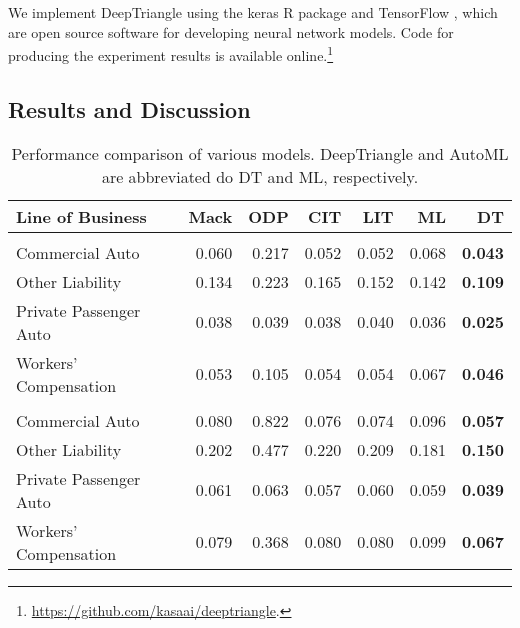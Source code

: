 \documentclass[risks,article,submit,moreauthors,pdftex]{mdpi}
\begin{document}
We implement DeepTriangle using the keras R package \citep{chollet2017kerasR} and TensorFlow \citep{tensorflow2015-whitepaper}, which are open source software for developing neural network models. Code for producing the experiment results is available online.\footnote{\url{https://github.com/kasaai/deeptriangle}.}

\hypertarget{results-and-discussion}{%
\subsection{Results and Discussion}\label{results-and-discussion}}

\begin{table}[t]

\caption{\label{tab:unnamed-chunk-1}\label{tab:table1}Performance comparison of various models. DeepTriangle and AutoML are abbreviated do DT and ML, respectively.}
\centering
\begin{tabular}{lrrrrr>{\bfseries}r}
\toprule
Line of Business & Mack & ODP & CIT & LIT & ML & DT\\
\midrule
\addlinespace[0.3em]
\multicolumn{7}{l}{\textbf{MAPE}}\\
\hspace{1em}Commercial Auto & 0.060 & 0.217 & 0.052 & 0.052 & 0.068 & 0.043\\
\hspace{1em}Other Liability & 0.134 & 0.223 & 0.165 & 0.152 & 0.142 & 0.109\\
\hspace{1em}Private Passenger Auto & 0.038 & 0.039 & 0.038 & 0.040 & 0.036 & 0.025\\
\hspace{1em}Workers' Compensation & 0.053 & 0.105 & 0.054 & 0.054 & 0.067 & 0.046\\
\addlinespace[0.3em]
\multicolumn{7}{l}{\textbf{RMSPE}}\\
\hspace{1em}Commercial Auto & 0.080 & 0.822 & 0.076 & 0.074 & 0.096 & 0.057\\
\hspace{1em}Other Liability & 0.202 & 0.477 & 0.220 & 0.209 & 0.181 & 0.150\\
\hspace{1em}Private Passenger Auto & 0.061 & 0.063 & 0.057 & 0.060 & 0.059 & 0.039\\
\hspace{1em}Workers' Compensation & 0.079 & 0.368 & 0.080 & 0.080 & 0.099 & 0.067\\
\bottomrule
\end{tabular}
\end{table}
\end{document}
